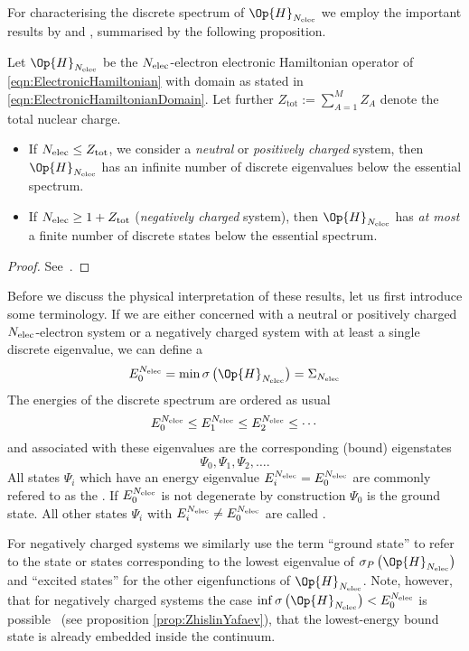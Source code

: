 For characterising the discrete spectrum of $\Op{H}_{\Nelec}$
we employ the important results by \citet{Zhislin1961} and \citet{Yafaev1976},
summarised by the following proposition.
\begin{prop}
	\label{prop:ZhislinYafaev}
	Let $\Op{H}_{\Nelec}$ be the $N_\text{elec}$-electron electronic Hamiltonian
	operator of \eqref{eqn:ElectronicHamiltonian}
	with domain as stated in \eqref{eqn:ElectronicHamiltonianDomain}.
	Let further $Z_\text{tot} := \sum_{A=1}^M Z_A$ denote the total nuclear charge.
	\begin{itemize}
		\item If $N_\text{elec} \leq Z_\text{tot}$, \ie we consider a \emph{neutral}
			or \emph{positively charged} system, then
			$\Op{H}_{\Nelec}$
			has an infinite number of discrete eigenvalues
			below the essential spectrum.
		\item If $N_\text{elec} \geq 1 + Z_\text{tot}$ (\emph{negatively charged} system),
			then $\Op{H}_{\Nelec}$ has \emph{at most} a finite number of discrete
			states below the essential spectrum.
	\end{itemize}
	\begin{proof}
		See~\cite{Zhislin1961,Yafaev1976}.
	\end{proof}
\end{prop}
Before we discuss the physical interpretation of these results,
let us first introduce some terminology.
If we are either concerned with a neutral or positively charged
$N_\text{elec}$-electron system or a negatively charged system
with at least a single discrete eigenvalue, we can define a 
\begin{equation}
	E^{\Nelec}_0 = \min \sigma\left(\Op{H}_{\Nelec}\right) = \Sigma_{\Nelec}
	\label{eqn:GroundStateEnergy}
\end{equation}
The energies of the discrete spectrum are ordered as usual
\[ E^{N_\text{elec}}_0 \leq E^{N_\text{elec}}_1 \leq E^{N_\text{elec}}_2 \leq \cdots \]
and associated with these eigenvalues are the corresponding (bound) eigenstates
\[ \Psi_0, \Psi_1, \Psi_2, \ldots. \]
All states $\Psi_i$ which have an energy eigenvalue $E^{N_\text{elec}}_i = E^{N_\text{elec}}_0$
are commonly refered to as the .
If $E^{N_\text{elec}}_0$ is not degenerate by construction
$\Psi_0$ is the ground state.
All other states $\Psi_i$ with $E^{N_\text{elec}}_i \neq E^{N_\text{elec}}_0$
are called .

For negatively charged systems we similarly use the
term ``ground state'' to refer to the state or states corresponding
to the lowest eigenvalue of $\sigma_P\left(\Op{H}_{\Nelec}\right)$
and ``excited states'' for the other eigenfunctions of $\Op{H}_{\Nelec}$.
Note, however, that for negatively charged systems
the case \mbox{$\inf \sigma\left(\Op{H}_{\Nelec}\right) < E^{\Nelec}_0$} is possible%
~(see proposition \ref{prop:ZhislinYafaev}),
\ie that the lowest-energy bound state is already embedded inside the continuum.

